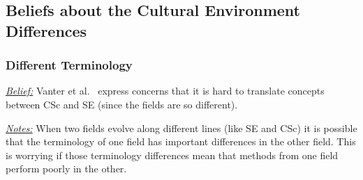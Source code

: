 \documentclass[conference,10pt]{IEEEtran}
\begin{document}
 















\subsection{Beliefs about the Cultural Environment Differences}



\subsubsection{Different Terminology}\label{terms}
\noindent \textit{\underline{Belief:}} 
Vanter et al.~\cite{faulk09_secs, easterbrook_cs, boyle09_lessons} express concerns
that it is hard to translate concepts between  CSc and SE (since the fields are so different). 

\noindent \textit{\underline{Notes:}} When two fields evolve along different
lines (like SE and CSc) it is possible that the terminology of one field has important
differences in the other field. This is worrying if those terminology differences mean that methods from one field perform poorly in the other.
\end{document}

